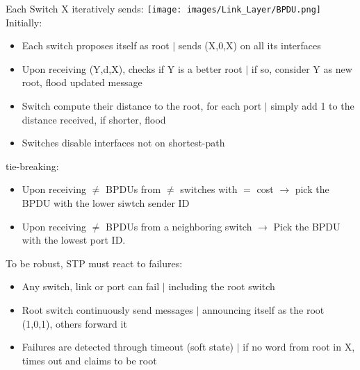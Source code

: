\documentclass[a4paper, fontsize=8pt, landscape, DIV=1]{scrartcl}
\begin{document}
\begin{multicols*}{4}
   		Each Switch X iteratively sends: 
   		\texttt{[image: images/Link\_Layer/BPDU.png]}
   		Initially: 
   		\vspace{-0.2cm}
   		\begin{itemize}[noitemsep]
   			\item Each switch proposes itself as root $\vert$ sends (X,0,X) on all its interfaces
   			\item Upon receiving (Y,d,X), checks if Y is a better root $\vert$ if so, consider Y as new root, flood updated message 
   			\item Switch compute their distance to the root, for each port $\vert$ simply add 1 to the distance received, if shorter, flood
   			\item Switches disable interfaces not on shortest-path
   		\end{itemize}
   		tie-breaking: 
   		\vspace{-0.2cm}
   		\begin{itemize}[noitemsep]
   			\item Upon receiving $\ne$ BPDUs from $\ne$ switches with $=$ cost $\rightarrow$ pick the BPDU with the lower siwtch sender ID
   			\item Upon receiving $\ne$ BPDUs from a neighboring switch $\rightarrow$ Pick the BPDU with the lowest port ID. 
   		\end{itemize}
   		To be robust, STP must react to failures: 
   		\vspace{-0.2cm}
   		\begin{itemize}[noitemsep]
   			\item Any switch, link or port can fail $\vert$ including the root switch
   			\item Root switch continuously send messages $\vert$ announcing itself as the root (1,0,1), others forward it
   			\item Failures are detected through timeout (soft state) $\vert$ if no word from root in X, times out and claims to be root 
   		\end{itemize}

\end{multicols*}
\end{document}
